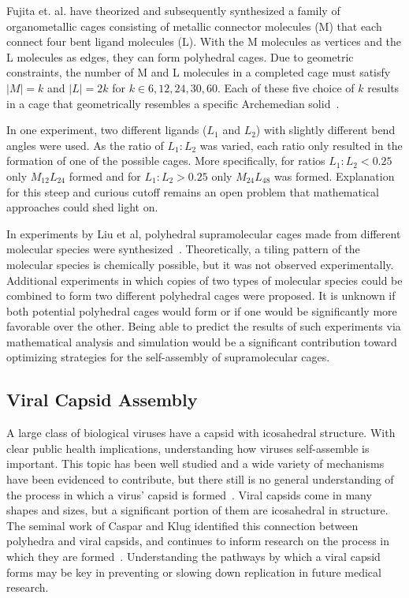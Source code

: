 Fujita et. al. have theorized and subsequently synthesized a family of organometallic cages consisting of metallic connector molecules (M) that each connect four bent ligand molecules (L). With the M molecules as vertices and the L molecules as edges, they can form polyhedral cages. Due to geometric constraints, the number of M and L molecules in  a completed cage must satisfy  $|M| = k$ and $|L| = 2k$ for $k \in 6, 12, 24, 30, 60$. Each of these five choice of $k$ results in a cage that geometrically resembles a specific Archemedian solid~\cite{Li2011}. 

In one experiment, two different ligands ($L_1$ and $L_2$) with slightly different bend angles were used. As the ratio of $L_1:L_2$ was varied, each ratio only resulted in the formation of one of the possible cages. More specifically, for ratios $L_1:L_2 < 0.25$ only $M_{12}L_{24}$ formed and for  $L_1:L_2 > 0.25$ only $M_{24}L_{48}$ was formed. Explanation for this steep and curious cutoff remains an open problem that mathematical approaches could shed light on.

In experiments by Liu et al, polyhedral supramolecular cages made from different molecular species were synthesized~\cite{Liu2011}. Theoretically, a tiling pattern of the molecular species is chemically possible, but it was not observed experimentally. Additional experiments in which copies of two types of molecular species could be combined to form two different polyhedral cages were proposed. It is unknown if both potential polyhedral cages would form or if one would be significantly more favorable over the other. Being able to predict the results of such experiments via mathematical analysis and simulation would be a significant contribution toward optimizing strategies for the self-assembly of supramolecular cages. 

\subsection{Viral Capsid Assembly}

A large class of biological viruses have a capsid with icosahedral structure. With clear public health implications, understanding how viruses self-assemble is important. This topic has been well studied and a wide variety of mechanisms have been evidenced to contribute, but there still is no general understanding of the process in which a virus' capsid is formed~\cite{Berger1994}. Viral capsids come in many shapes and sizes, but a significant portion of them are icosahedral in structure. The seminal work of Caspar and Klug identified this connection between polyhedra and viral capsids, and continues to inform research on the process in which they are formed~\cite{Caspar1962}. Understanding the pathways by which a viral capsid forms may be key in preventing or slowing down replication in future medical research.  

